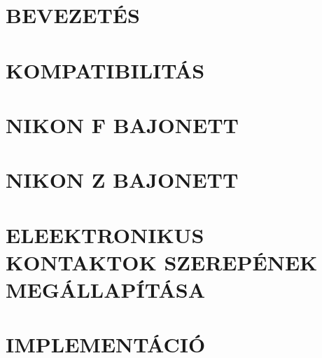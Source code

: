 









%
%
%
%


\newpage
\tableofcontents
\newpage





\clearpage
\section{BEVEZETÉS}

\clearpage
\section{KOMPATIBILITÁS}

\clearpage
\section{NIKON F BAJONETT}

\clearpage
\section{NIKON Z BAJONETT}

\clearpage
\section{ELEEKTRONIKUS KONTAKTOK SZEREPÉNEK MEGÁLLAPÍTÁSA}

\clearpage
\section{IMPLEMENTÁCIÓ}


%










